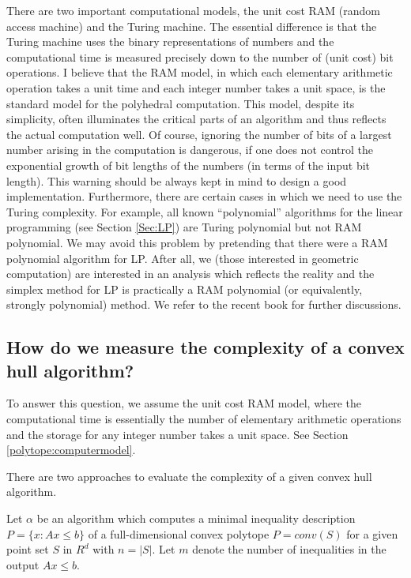 \documentclass[[a4paper,12pt]{article}
\begin{document}
There are two important computational models, the unit cost RAM
(random access machine)
 and the Turing machine. The essential difference is
that the Turing machine uses the binary representations
of numbers and the computational time is measured precisely
down to the number of (unit cost) bit operations.
I believe that the RAM model, in which 
each elementary arithmetic operation takes a unit time
 and each integer number takes a unit space,
is the standard model for the polyhedral computation.
This model, despite its simplicity, often illuminates
the critical parts of an algorithm and thus
reflects the actual computation well.   
Of course, ignoring the number of bits
of a largest number arising in the computation is dangerous,
if one does not control the exponential growth of bit lengths of
the numbers (in terms of the input bit length).   This warning should be
always kept in mind to design a good implementation.
Furthermore, there are certain cases in which 
we need to use the Turing complexity.
For example, all known ``polynomial'' algorithms for the linear programming
(see Section \ref{Sec:LP}) are Turing polynomial but not RAM polynomial. 
We may avoid this problem by pretending that there were a RAM polynomial
algorithm for LP.  After all, we (those interested in
geometric computation) are interested in an analysis
which reflects the reality and the simplex method for LP is
practically a RAM polynomial (or equivalently, strongly polynomial)
method. 
We refer to the recent book \cite{y-fpaa-00} for further discussions.

\subsection{How do we measure the complexity of 
 a convex hull algorithm?} \label{polytope:rconvcomplexity}

To answer this question, we assume the unit cost RAM model, where
the computational time is essentially
the number of elementary arithmetic operations and the storage for 
any integer number takes a unit space. See Section \ref{polytope:computermodel}.

There are two approaches to evaluate
the complexity of a given convex hull algorithm.

Let $\alpha$ be an algorithm which computes a minimal 
inequality description $P=\{x : A x \le b \}$
of a full-dimensional convex polytope $P=conv(S)$ 
for a given point set $S$ in $R^d$
with $n=|S|$.  Let $m$ denote the number of inequalities in
the output $A x \le b$.  
\end{document}
